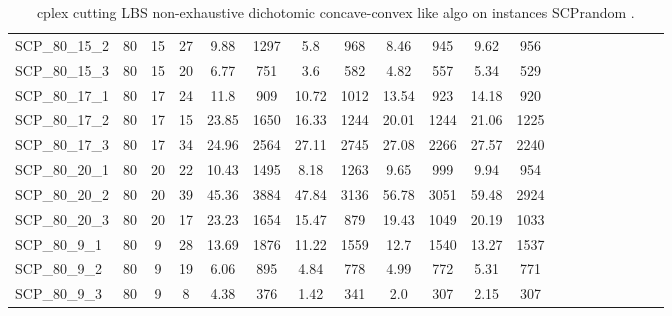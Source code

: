 \begin{sidewaystable}[!ht]
{\begin{tabular}{lccccccccccccccccccc}
SCP\_80\_15\_2 & 80 & 15 & 27 & 9.88 & 1297 &  \textcolor{blue2}{5.8} & 968 & 8.46 & 945 & 9.62 & 956 \\
SCP\_80\_15\_3 & 80 & 15 & 20 & 6.77 & 751 &  \textcolor{blue2}{3.6} & 582 & 4.82 & 557 & 5.34 & 529 \\
SCP\_80\_17\_1 & 80 & 17 & 24 & 11.8 & 909 &  \textcolor{blue2}{10.72} & 1012 & 13.54 & 923 & 14.18 & 920 \\
SCP\_80\_17\_2 & 80 & 17 & 15 & 23.85 & 1650 &  \textcolor{blue2}{16.33} & 1244 & 20.01 & 1244 & 21.06 & 1225 \\
SCP\_80\_17\_3 & 80 & 17 & 34 &  \textcolor{blue2}{24.96} & 2564 & 27.11 & 2745 & 27.08 & 2266 & 27.57 & 2240 \\
SCP\_80\_20\_1 & 80 & 20 & 22 & 10.43 & 1495 &  \textcolor{blue2}{8.18} & 1263 & 9.65 & 999 & 9.94 & 954 \\
SCP\_80\_20\_2 & 80 & 20 & 39 &  \textcolor{blue2}{45.36} & 3884 & 47.84 & 3136 & 56.78 & 3051 & 59.48 & 2924 \\
SCP\_80\_20\_3 & 80 & 20 & 17 & 23.23 & 1654 &  \textcolor{blue2}{15.47} & 879 & 19.43 & 1049 & 20.19 & 1033 \\
SCP\_80\_9\_1 & 80 & 9 & 28 & 13.69 & 1876 &  \textcolor{blue2}{11.22} & 1559 & 12.7 & 1540 & 13.27 & 1537 \\
SCP\_80\_9\_2 & 80 & 9 & 19 & 6.06 & 895 &  \textcolor{blue2}{4.84} & 778 & 4.99 & 772 & 5.31 & 771 \\
SCP\_80\_9\_3 & 80 & 9 & 8 & 4.38 & 376 &  \textcolor{blue2}{1.42} & 341 & 2.0 & 307 & 2.15 & 307 \\
\bottomrule
\end{tabular}
}%
\caption{cplex cutting LBS non-exhaustive dichotomic concave-convex like algo on instances SCPrandom .}
\label{tab:table_lambda_limits_SCPrandom }
\end{sidewaystable}
